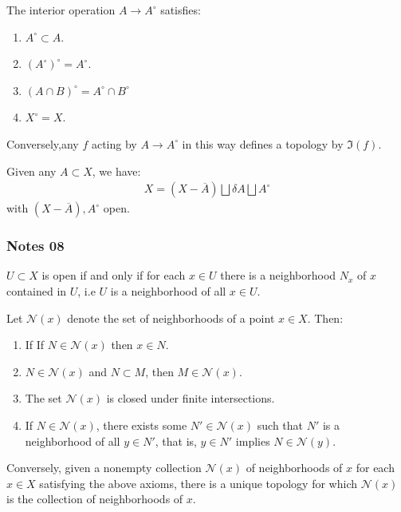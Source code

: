 \documentclass[12pt,letterpaper,reqno]{article}
\begin{document}
\begin{theorem}\label{theorem:dual-kuratowski-interior-axioms}
    The interior operation $A \to A^{\circ}$ satisfies:
    \begin{enumerate}
        \item $A^{\circ} \subset A$.
        \item $(A^{\circ})^{\circ} = A^{\circ}$.
        \item $(A \cap B)^{\circ} = A^{\circ} \cap B^{\circ}$
        \item $X^{\circ} = X$.
    \end{enumerate}
    Conversely,any $f$ acting by $A \to A^{\circ}$ in this way defines a topology by $\Im(f)$.
\end{theorem}

\begin{theorem}\label{theorem:interior-exterior-boundary-decomposition}
    Given any $A \subset X$, we have:
    \begin{align*}
        X = (X - \overline{A}) \bigsqcup \delta A \bigsqcup A^{\circ}
    \end{align*}
    with $(X - \overline{A}), A^{\circ}$ open.
\end{theorem}

\subsubsection{Notes 08}

\begin{lemma}\label{lemma:characterization-of-opens-by-neighborhoods}
    $U \subset X$ is open if and only if for each $x \in U$ there is a neighborhood $N_{x}$ of $x$ contained in $U$, i.e $U$ is a neighborhood of all $x \in U$.
\end{lemma}

\begin{theorem}\label{theorem:haussdorff-neighborhood-axioms}
    Let $\mathcal{N}(x)$ denote the set of neighborhoods of a point $x \in X$. Then:
    \begin{enumerate}
        \item If If $N \in \mathcal{N}(x)$ then $x \in N$.
        \item $N \in \mathcal{N}(x)$ and $N \subset M$, then $M \in \mathcal{N}(x)$.
        \item The set $\mathcal{N}(x)$ is closed under finite intersections.
        \item If $N \in \mathcal{N}(x)$, there exists some $N' \in \mathcal{N}(x)$ such that $N'$ is a neighborhood of all $y \in N'$, that is, $y \in N'$ implies $N \in \mathcal{N}(y)$.
    \end{enumerate}
    Conversely, given a nonempty collection $\mathcal{N}(x)$ of neighborhoods of $x$ for each $x \in X$ satisfying the above axioms, there is a unique topology for which $\mathcal{N}(x)$ is the collection of neighborhoods of $x$.
\end{theorem}
\end{document}
